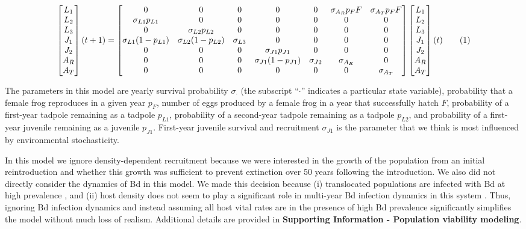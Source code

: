 \documentclass[9pt,twocolumn,twoside,lineno]{pnas-new}
\begin{document}
{\begin{figure}\[
\begin{bmatrix}
L_1 \\
L_2 \\
L_3 \\
J_1 \\
J_2 \\
A_R \\ 
A_T
\end{bmatrix}(t + 1) = 
\begin{bmatrix}
  0 & 0 & 0 & 0 & 0 & \sigma_{A_R} p_F F & \sigma_{A_T} p_F F \\
  \sigma_{L1} p_{L1} & 0 & 0 & 0 & 0 & 0 & 0 \\
  0 & \sigma_{L2} p_{L2} & 0 & 0 & 0 & 0 & 0\\
  \sigma_{L1} (1 - p_{L1}) & \sigma_{L2} (1 - p_{L2}) & \sigma_{L3} & 0 & 0 & 0 & 0 \\
  0 & 0 & 0 & \sigma_{J1} p_{J1} & 0 & 0 & 0 \\
  0 & 0 & 0 & \sigma_{J1} (1 - p_{J1}) & \sigma_{J2}  & \sigma_{A_R} & 0 \\
  0 & 0 & 0 & 0 & 0 & 0 & \sigma_{A_T} 
\end{bmatrix} \begin{bmatrix}
L_1 \\
L_2 \\
L_3 \\
J_1 \\
J_2 \\
A_R \\
A_T \\
\end{bmatrix}(t)\numberthis \label{eqn:matrix} 
\]\end{figure}

The parameters in this model are yearly survival probability
\(\sigma_{\cdot}\) (the subscript ``\(\cdot\)'' indicates a particular
state variable), probability that a female frog reproduces in a given
year \(p_F\), number of eggs produced by a female frog in a year that
successfully hatch \(F\), probability of a first-year tadpole remaining
as a tadpole \(p_{L1}\), probability of a second-year tadpole remaining
as a tadpole \(p_{L2}\), and probability of a first-year juvenile
remaining as a juvenile \(p_{J1}\). First-year juvenile survival and
recruitment \(\sigma_{J1}\) is the parameter that we think is most
influenced by environmental stochasticity.

In this model we ignore density-dependent recruitment because we were
interested in the growth of the population from an initial
reintroduction and whether this growth was sufficient to prevent
extinction over 50 years following the introduction. We also did not
directly consider the dynamics of Bd in this model. We made this
decision because (i) translocated populations are infected with Bd at
high prevalence \citep{joseph2018}, and (ii) host density does not seem
to play a significant role in multi-year Bd infection dynamics in this
system \citep{wilber2022}. Thus, ignoring Bd infection dynamics and
instead assuming all host vital rates are in the presence of high Bd
prevalence significantly simplifies the model without much loss of
realism. Additional details are provided in \textbf{Supporting
Information - Population viability modeling}.

}
\end{document}
